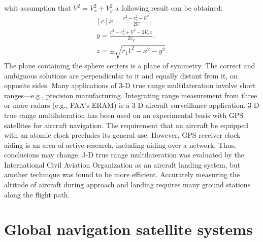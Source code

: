 whit assumption that $V^{2} = V_{x}^{2} + V_{y}^{2}$ a following result can be obtained:
\begin{equation}
	\label{equ:three_point_pyt}
	\begin{aligned}[c]
		x = \frac{r_{1}^{2}-r_{2}^{2}+U^{2}}{2U},\\
		y = \frac{r_{1}^{2}-r_{3}^{2}+V^{2}-2V_{x}x}{2v_{y}},\\
		z = \pm \sqrt{r_1{1}^{2}-x^{2}-y^{2}}.
	\end{aligned}
\end{equation}
The plane containing the sphere centers is a plane of symmetry.
The correct and ambiguous solutions are perpendicular to it and equally distant from it, 
on opposite sides.
Many applications of 3-D true range multilateration involve short ranges—e.g.,
precision manufacturing.
Integrating range measurement from three or more radars (e.g., FAA's ERAM) is a 3-D aircraft
surveillance application. 3-D true range multilateration has been used on an experimental 
basis with GPS satellites for aircraft navigation.
The requirement that an aircraft be equipped with an atomic clock precludes its general use.
However, GPS receiver clock aiding is an area of active research, including aiding over 
a network.
Thus, conclusions may change. 3-D true range multilateration was evaluated by the 
International Civil Aviation Organization as an aircraft landing system, but another technique was
found to be more efficient.
Accurately measuring the altitude of aircraft during approach and landing requires many
ground stations along the flight path. 

\section{Global navigation satellite systems}

